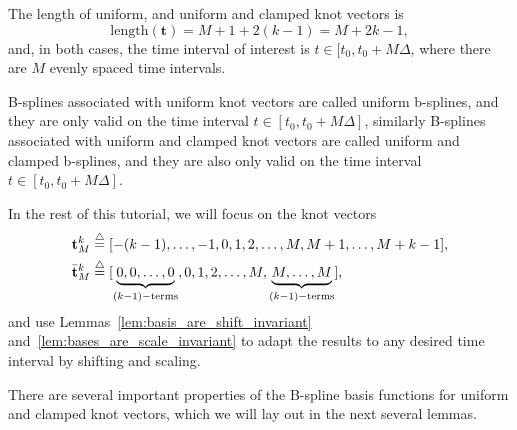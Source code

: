 The length of uniform, and uniform and clamped knot vectors is 
\[
\text{length}(\mathbf{t}) = M+1 + 2(k-1) = M+2k-1,
\]
and, in both cases, the time interval of interest is $t\in[t_0, t_0+M\Delta$, where there are $M$ evenly spaced time intervals. 

B-splines associated with uniform knot vectors are called uniform b-splines, and they are only valid on the time interval $t\in[t_0, t_0+M\Delta]$, similarly B-splines associated with uniform and clamped knot vectors are called uniform and clamped b-splines, and they are also only valid on the time interval $t\in[t_0, t_0+M\Delta]$.

In the rest of this tutorial, we will focus on the knot vectors
\begin{align}
	\mathbf{t}^k_M &\defeq [-(k-1), \dots, -1, 0, 1, 2, \dots, M, M+1, \dots, M+k-1],
		\label{eq:knot_vector_t_M} \\ 
	\bar{\mathbf{t}}^k_M &\defeq [\underbrace{0, 0, \dots, 0}_{(k-1)-\text{terms}}, 0, 1, 2, \dots, M, \underbrace{M, \dots, M}_{(k-1)-\text{terms}}], 
	\label{eq:knot_vector_tbar_M}
\end{align}
and use Lemmas~\ref{lem:basis_are_shift_invariant} and~\ref{lem:bases_are_scale_invariant} to adapt the results to any desired time interval by shifting and scaling.

There are several important properties of the B-spline basis functions for uniform and clamped knot vectors, which we will lay out in the next several lemmas.

